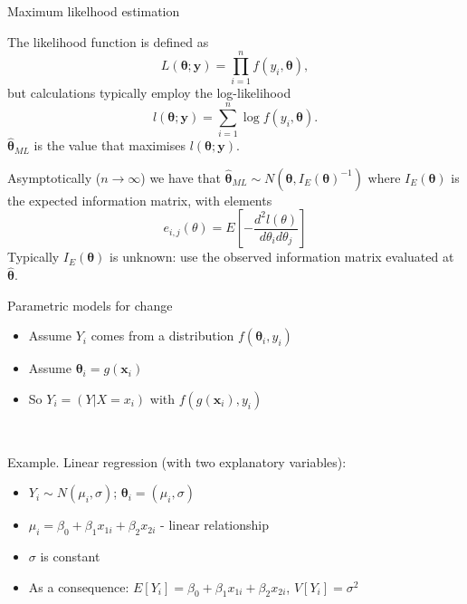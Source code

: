 \documentclass[
  10pt,
  ignorenonframetext,
  compress]{beamer}
\providecommand{\tightlist}{%
  \setlength{\itemsep}{0pt}\setlength{\parskip}{0pt}}
\begin{document}
\begin{frame}{Maximum likelhood estimation}
\protect\hypertarget{maximum-likelhood-estimation}{}

The likelihood function is defined as
\[L(\boldsymbol{\theta}; \boldsymbol{y}) = \prod_{i=1}^{n} f(y_i, \boldsymbol{\theta}), \]
but calculations typically employ the log-likelihood
\[l(\boldsymbol{\theta}; \boldsymbol{y}) = \sum_{i=1}^{n} \log f(y_i, \boldsymbol{\theta}).\]
\(\hat{\boldsymbol{\theta}}_{ML}\) is the value that maximises
\(l(\boldsymbol{\theta}; \boldsymbol{y})\). \pause 

Asymptotically (\(n \rightarrow \infty\)) we have that
\(\hat{\boldsymbol{\theta}}_{ML} \sim N(\boldsymbol{\theta}, I_E(\boldsymbol{\theta})^{-1})\)
where \(I_E(\boldsymbol{\theta})\) is the expected information matrix,
with elements
\[e_{i,j}(\theta) = E\left[ - \frac{d^2 l(\theta)}{d \theta_i d \theta_j} \right] \]
Typically \(I_E(\boldsymbol{\theta})\) is unknown: use the observed
information matrix evaluated at \(\hat{\boldsymbol{\theta}}\).

\end{frame}

\begin{frame}{Parametric models for change}
\protect\hypertarget{parametric-models-for-change}{}

\begin{itemize}
\tightlist
\item
  Assume \(Y_i\) comes from a distribution
  \(f(\boldsymbol{\theta}_i,y_i)\)
\item
  Assume \(\boldsymbol{\theta}_i = g(\boldsymbol{x}_i)\)
\item
  So \(Y_i = (Y|X=x_i)\) with \(f(g(\boldsymbol{x}_i),y_i)\)
\end{itemize}

~

Example. Linear regression (with two explanatory variables):

\begin{itemize}
\tightlist
\item
  \(Y_i \sim N(\mu_i, \sigma)\);
  \(\boldsymbol{\theta}_i = (\mu_i, \sigma)\)
\item
  \(\mu_i = \beta _0 + \beta_1 x_{1i} + \beta_2 x_{2i}\) - linear
  relationship
\item
  \(\sigma\) is constant
\item
  As a consequence:
  \(E[Y_i] = \beta _0 + \beta_1 x_{1i} + \beta_2 x_{2i}\),
  \(V[Y_i] = \sigma^2\)
\end{itemize}

\end{frame}
\end{document}
